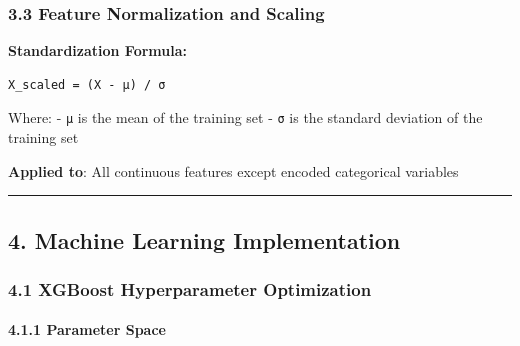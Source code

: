 \subsubsection{3.3 Feature Normalization and
Scaling}\label{feature-normalization-and-scaling}

\textbf{Standardization Formula:}

\begin{verbatim}
X_scaled = (X - μ) / σ
\end{verbatim}

Where: - \texttt{μ} is the mean of the training set - \texttt{σ} is the
standard deviation of the training set

\textbf{Applied to}: All continuous features except encoded categorical
variables

\begin{center}\rule{0.5\linewidth}{0.5pt}\end{center}

\subsection{4. Machine Learning
Implementation}\label{machine-learning-implementation}

\subsubsection{4.1 XGBoost Hyperparameter
Optimization}\label{xgboost-hyperparameter-optimization}

\paragraph{4.1.1 Parameter Space}\label{parameter-space}


